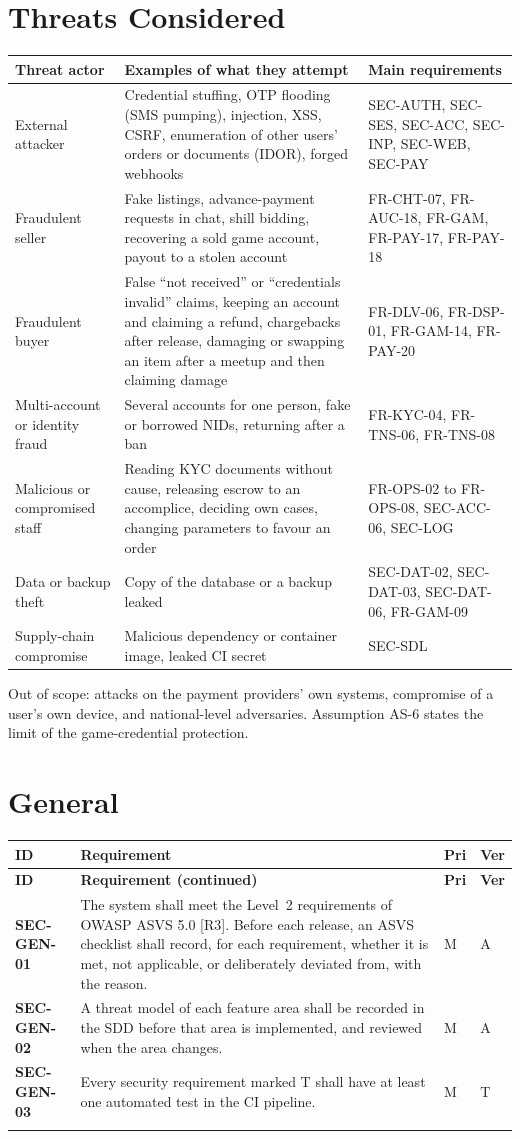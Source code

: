 \documentclass[11pt,a4paper]{report}
\makeatletter
\newenvironment{reqs}{%
  \small
  \begin{longtable}{@{}>{\raggedright\arraybackslash}p{2.35cm}
                       >{\raggedright\arraybackslash}p{10.3cm}
                       >{\centering\arraybackslash}p{0.7cm}
                       >{\centering\arraybackslash}p{0.7cm}@{}}
  \toprule
  \textbf{ID} & \textbf{Requirement} & \textbf{Pri} & \textbf{Ver} \\
  \midrule
  \endfirsthead
  \toprule
  \textbf{ID} & \textbf{Requirement (continued)} & \textbf{Pri} & \textbf{Ver} \\
  \midrule
  \endhead
  \bottomrule
  \endfoot
}{\end{longtable}}
\newcommand{\req}[5]{\leavevmode\textbf{#1}\hypertarget{#1}{} & #5 & #2 & #3 \\ \addlinespace[2pt]}
\makeatother
\begin{document}
\section{Threats Considered}
\begin{center}
\small
\begin{tabularx}{\textwidth}{@{}>{\raggedright\arraybackslash}p{3.5cm} X >{\raggedright\arraybackslash}p{3.0cm}@{}}
\toprule
\textbf{Threat actor} & \textbf{Examples of what they attempt} & \textbf{Main requirements} \\
\midrule
External attacker & Credential stuffing, OTP flooding (SMS pumping), injection, XSS, CSRF, enumeration of other users' orders or documents (IDOR), forged webhooks & SEC-AUTH, SEC-SES, SEC-ACC, SEC-INP, SEC-WEB, SEC-PAY \\
Fraudulent seller & Fake listings, advance-payment requests in chat, shill bidding, recovering a sold game account, payout to a stolen account & FR-CHT-07, FR-AUC-18, FR-GAM, FR-PAY-17, FR-PAY-18 \\
Fraudulent buyer & False ``not received'' or ``credentials invalid'' claims, keeping an account and claiming a refund, chargebacks after release, damaging or swapping an item after a meetup and then claiming damage & FR-DLV-06, FR-DSP-01, FR-GAM-14, FR-PAY-20 \\
Multi-account or identity fraud & Several accounts for one person, fake or borrowed NIDs, returning after a ban & FR-KYC-04, FR-TNS-06, FR-TNS-08 \\
Malicious or compromised staff & Reading KYC documents without cause, releasing escrow to an accomplice, deciding own cases, changing parameters to favour an order & FR-OPS-02 to FR-OPS-08, SEC-ACC-06, SEC-LOG \\
Data or backup theft & Copy of the database or a backup leaked & SEC-DAT-02, SEC-DAT-03, SEC-DAT-06, FR-GAM-09 \\
Supply-chain compromise & Malicious dependency or container image, leaked CI secret & SEC-SDL \\
\bottomrule
\end{tabularx}
\end{center}
Out of scope: attacks on the payment providers' own systems, compromise of a user's own device, and national-level adversaries. Assumption AS-6 states the limit of the game-credential protection.

\section{General}
\begin{reqs}
\req{SEC-GEN-01}{M}{A}{new}{The system shall meet the Level~2 requirements of OWASP ASVS 5.0 [R3]. Before each release, an ASVS checklist shall record, for each requirement, whether it is met, not applicable, or deliberately deviated from, with the reason.}
\req{SEC-GEN-02}{M}{A}{new}{A threat model of each feature area shall be recorded in the SDD before that area is implemented, and reviewed when the area changes.}
\req{SEC-GEN-03}{M}{T}{new}{Every security requirement marked T shall have at least one automated test in the CI pipeline.}
\end{reqs}
\end{document}
